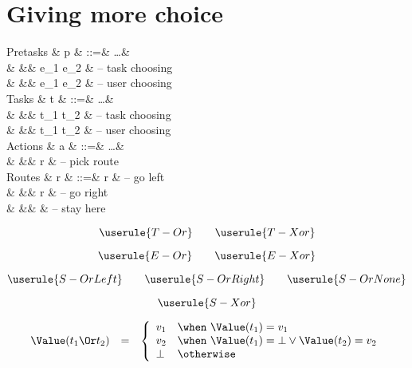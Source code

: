 
\section{Giving more choice}

\begin{grammar}
  Pretasks
    & p & ::=& \ldots       & \\
    &   &\mid& e_1 \Or e_2  & – task choosing \\
    &   &\mid& e_1 \Xor e_2 & – user choosing \\
  Tasks
    & t & ::=& \ldots       & \\
    &   &\mid& t_1 \Or t_2  & – task choosing \\
    &   &\mid& t_1 \Xor t_2 & – user choosing \\
  Actions
    & a & ::=& \ldots       & \\
    &   &\mid& \Pick r      & – pick route \\
  Routes
    & r & ::=& \Left r      & – go left \\
    &   &\mid& \Right r     & – go right \\
    &   &\mid& \Here        & – stay here \\
\end{grammar}

\begin{equation*}
  \userule{T-Or} \qquad \userule{T-Xor}
\end{equation*}

\begin{equation*}
  \userule{E-Or} \qquad \userule{E-Xor}
\end{equation*}

\begin{equation*}
  \userule{S-OrLeft} \qquad \userule{S-OrRight} \qquad \userule{S-OrNone}
\end{equation*}

\begin{equation*}
  \userule{S-Xor}
\end{equation*}

\begin{equation*}
  \begin{array}{lcl}
    \Value(t_1 \Or t_2) &=& \left\{
      \begin{array}{ll}
        v_1  & \when\ \Value(t_1) = v_1 \\
        v_2  & \when\ \Value(t_1) = \bot \lor \Value(t_2) = v_2 \\
        \bot & \otherwise
      \end{array}
    \right.
  \end{array}
\end{equation*}

